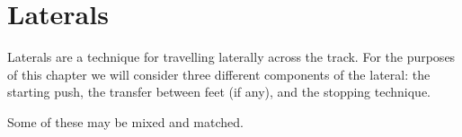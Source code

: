 \chapter{Laterals}
\label{ch:laterals}

Laterals are a technique for travelling laterally across the track.  
For the purposes of this chapter we will consider three different components of the lateral: the starting push, the transfer between feet (if any), and the stopping technique.         

Some of these may be mixed and matched. 

